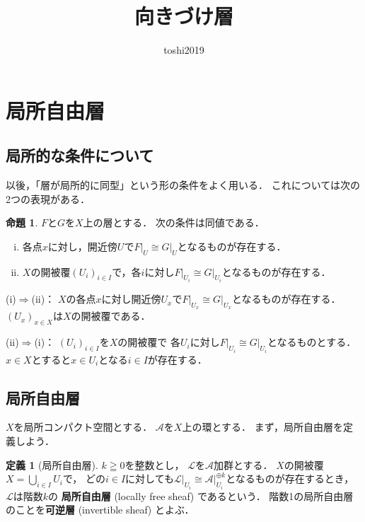 \documentclass[uplatex,dvipdfmx,a4paper,10pt,draft]{jsarticle}
\title{向きづけ層}
\author{toshi2019}
\makeatletter
\theoremstyle{definition}
\newcommand{\mcal}{\mathcal}
\renewenvironment{proof}[1][\proofname]{\par
  \pushQED{\qed}%
  \normalfont \topsep6\p@\@plus6\p@\relax
  \trivlist
  \item[\hskip\labelsep
         \bfseries
    {#1}]\ignorespaces
}{%
  \popQED\endtrivlist\@endpefalse
}
\renewcommand{\proofname}{証明.}
\numberwithin{equation}{section}
\newcommand{\cA}{\mcal{A}}
\newcommand{\cL}{\mcal{L}}
\newcommand{\mres}[2][]{{\left.{#1}\right\rvert}_{#2}}
\theoremstyle{mystyle}
\newtheorem{mydfn}[mythm]{定義}
\newtheorem{myprp}[mythm]{命題}
\newenvironment{dfn}{\begin{dfnbox}\begin{mydfn}}{\end{mydfn}\end{dfnbox}}
\newenvironment{prp}{\begin{prpbox}\begin{myprp}}{\end{myprp}\end{prpbox}}
\makeatother
\begin{document}
\maketitle

\section{局所自由層}
\subsection{局所的な条件について}\label{ssec:locality}

以後，「層が局所的に同型」という形の条件をよく用いる．
これについては次の2つの表現がある．
\begin{prp}
    \(F\)と\(G\)を\(X\)上の層とする．
    次の条件は同値である．
    \begin{enumerate}[(i)]
        \item 各点\(x\)に対し，開近傍\(U\)で\(\mres[F]{U}\cong\mres[G]{U}\)となるものが存在する．
        \item \(X\)の開被覆\((U_i)_{i\in I}\)で，各\(i\)に対し\(\mres[F]{U_{i}}\cong\mres[G]{U_{i}}\)となるものが存在する．
    \end{enumerate}
\end{prp}
\begin{proof}
    (i)\(\Rightarrow\)(ii)：
    \(X\)の各点\(x\)に対し開近傍\(U_x\)で\(
        \mres[F]{U_{x}}\cong\mres[G]{U_{x}}
    \)となるものが存在する．
    \((U_x)_{x\in X}\)は\(X\)の開被覆である．

    (ii)\(\Rightarrow\)(i)：
    \((U_i)_{i\in I}\)を\(X\)の開被覆で
    各\(U_i\)に対し\(\mres[F]{U_{i}}\cong\mres[G]{U_{i}}\)となるものとする．
    \(x\in X\)とすると\(x\in U_{i}\)となる\(i\in I\)が存在する．
\end{proof}
\subsection{局所自由層}
\(X\)を局所コンパクト空間とする．
\(\cA\)を\(X\)上の環とする．
まず，局所自由層を定義しよう．
\begin{dfn}[局所自由層]
    \(k\geqq 0\)を整数とし，
    \(\cL\)を\(\cA\)加群とする．
    \(X\)の開被覆\(X=\bigcup_{i\in I}U_i\)で，
    どの\(i\in I\)に対しても\(
        \mres[\cL]{U_{i}}
        \cong 
        \mres[\cA]{U_{i}}^{\oplus k}
    \)となるものが存在するとき，
    \(\cL\)は階数\(k\)の
    \textbf{局所自由層} (locally free sheaf) であるという．
    階数1の局所自由層のことを\textbf{可逆層} (invertible sheaf) とよぶ．
\end{dfn}
\end{document}
